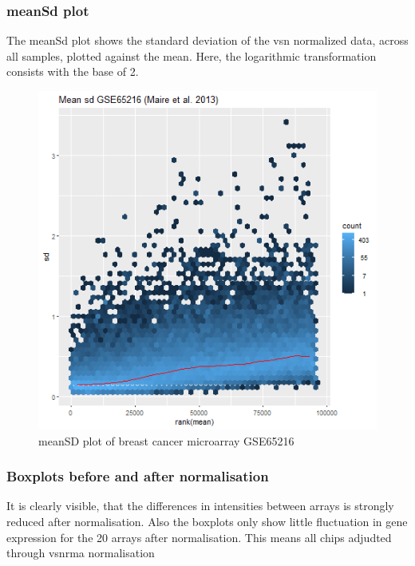 \documentclass[
]{article}
\begin{document}
\hypertarget{meansd-plot}{%
\subsubsection{meanSd plot}\label{meansd-plot}}

The meanSd plot shows the standard deviation of the vsn normalized data,
across all samples, plotted against the mean. Here, the logarithmic
transformation consists with the base of 2.

\begin{figure}

{\centering \includegraphics[width=0.5\linewidth]{images/breast_meansdPlot} 

}

\caption{meanSD plot of breast cancer microarray GSE65216}\label{fig:unnamed-chunk-2}
\end{figure}

\hypertarget{boxplots-before-and-after-normalisation}{%
\subsubsection{Boxplots before and after
normalisation}\label{boxplots-before-and-after-normalisation}}

It is clearly visible, that the differences in intensities between
arrays is strongly reduced after normalisation. Also the boxplots only
show little fluctuation in gene expression for the 20 arrays after
normalisation. This means all chips adjudted through vsnrma
normalisation
\end{document}
